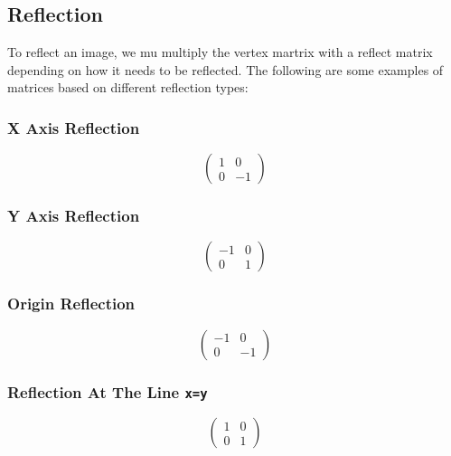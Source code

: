 \documentclass[a4paper,10pt]{article}
\begin{document}
      \subsection{Reflection}
        To reflect an image, we mu multiply the vertex martrix with a reflect matrix depending on how it needs to be reflected. The following are some examples of matrices based on different reflection types:
        \subsubsection{X Axis Reflection}
          \begin{equation*}
            \begin{pmatrix}
              1 & 0\\0 & -1
            \end{pmatrix}
          \end{equation*}

        \subsubsection{Y Axis Reflection}
          \begin{equation*}
            \begin{pmatrix}
              -1 & 0\\0 & 1
            \end{pmatrix}
          \end{equation*}

        \subsubsection{Origin Reflection}
          \begin{equation*}
            \begin{pmatrix}
              -1 & 0\\0 & -1
            \end{pmatrix}
          \end{equation*}

        \subsubsection{Reflection At The Line \texttt{x=y}}
          \begin{equation*}
            \begin{pmatrix}
              1 & 0\\0 & 1
            \end{pmatrix}
          \end{equation*}
\end{document}
